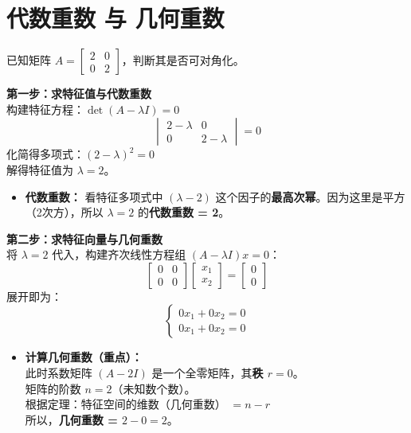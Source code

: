 \documentclass[12pt]{article}
\begin{document}
\section{代数重数 与 几何重数}
\begin{flushleft}
    已知矩阵 $A = \begin{bmatrix} 2 & 0 \\ 0 & 2 \end{bmatrix}$，判断其是否可对角化。

    \vspace{0.5em}
    \noindent\textbf{第一步：求特征值与代数重数} \\
    构建特征方程：$\det(A - \lambda I) = 0$
    \[
        \begin{vmatrix}
            2 - \lambda & 0           \\
            0           & 2 - \lambda
        \end{vmatrix} = 0
    \]
    化简得多项式：$(2 - \lambda)^2 = 0$ \\
    解得特征值为 $\lambda = 2$。
    \begin{itemize}
        \item \textbf{代数重数：} 看特征多项式中 $(\lambda - 2)$ 这个因子的\textbf{最高次幂}。因为这里是平方（2次方），所以 $\lambda = 2$ 的\textbf{代数重数 = 2}。
    \end{itemize}

    \vspace{0.5em}
    \noindent\textbf{第二步：求特征向量与几何重数} \\
    将 $\lambda = 2$ 代入，构建齐次线性方程组 $(A - \lambda I)x = 0$：
    \[
        \begin{bmatrix} 0 & 0 \\ 0 & 0 \end{bmatrix}
        \begin{bmatrix} x_1 \\ x_2 \end{bmatrix} =
        \begin{bmatrix} 0 \\ 0 \end{bmatrix}
    \]
    展开即为：
    \[
        \begin{cases}
            0x_1 + 0x_2 = 0 \\
            0x_1 + 0x_2 = 0
        \end{cases}
    \]

    \begin{itemize}
        \item \textbf{计算几何重数（重点）：} \\
              此时系数矩阵 $(A - 2I)$ 是一个全零矩阵，其\textbf{秩 $r = 0$}。\\
              矩阵的阶数 $n = 2$（未知数个数）。\\
              根据定理：特征空间的维数（几何重数） $= n - r$ \\
              所以，\textbf{几何重数 = $2 - 0 = 2$}。
    \end{itemize}


\end{flushleft}
\end{document}
